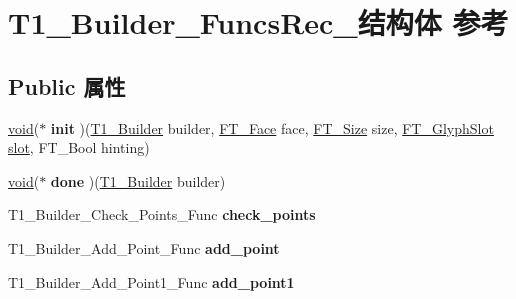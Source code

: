 \hypertarget{struct_t1___builder___funcs_rec__}{}\section{T1\+\_\+\+Builder\+\_\+\+Funcs\+Rec\+\_\+结构体 参考}
\label{struct_t1___builder___funcs_rec__}
\subsection*{Public 属性}
\begin{DoxyCompactItemize}
\item 
\mbox{\label{struct_t1___builder___funcs_rec___a5c57e8082c47e5501e19109e69f63256}} 
\hyperlink{interfacevoid}{void}($\ast$ {\bfseries init} )(\hyperlink{struct_t1___builder_rec__}{T1\+\_\+\+Builder} builder, \hyperlink{struct_f_t___face_rec__}{F\+T\+\_\+\+Face} face, \hyperlink{struct_f_t___size_rec__}{F\+T\+\_\+\+Size} size, \hyperlink{struct_f_t___glyph_slot_rec__}{F\+T\+\_\+\+Glyph\+Slot} \hyperlink{struct__slot}{slot}, F\+T\+\_\+\+Bool hinting)
\item 
\mbox{\label{struct_t1___builder___funcs_rec___abc3acc445cc942287de8cb4089513aff}} 
\hyperlink{interfacevoid}{void}($\ast$ {\bfseries done} )(\hyperlink{struct_t1___builder_rec__}{T1\+\_\+\+Builder} builder)
\item 
\mbox{\label{struct_t1___builder___funcs_rec___a303aa60891edacdc0a9665663577a44a}} 
T1\+\_\+\+Builder\+\_\+\+Check\+\_\+\+Points\+\_\+\+Func {\bfseries check\+\_\+points}
\item 
\mbox{\label{struct_t1___builder___funcs_rec___a8f06e116ae86a88bb3d6d2ea5fd6fdd1}} 
T1\+\_\+\+Builder\+\_\+\+Add\+\_\+\+Point\+\_\+\+Func {\bfseries add\+\_\+point}
\item 
\mbox{\label{struct_t1___builder___funcs_rec___a52113cffcd739ad679c0b162dc81b530}} 
T1\+\_\+\+Builder\+\_\+\+Add\+\_\+\+Point1\+\_\+\+Func {\bfseries add\+\_\+point1}
\item 
\mbox{\label{struct_t1___builder___funcs_rec___af069cac890c0d2d27532a973ffa95a33}} 

\end{DoxyCompactItemize}
